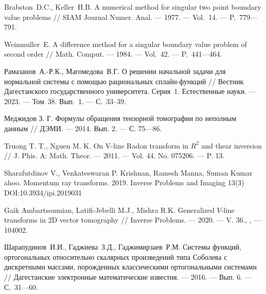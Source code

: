 \begin{thebibliography}{11}
Brabston~D.C., Keller~H.B. A numerical method for singular
 two point  boundary value problems
 // SIAM Journal Numer. Anal. --- 1977. --- Vol.~14. --- P.~779---791.





Weinmuller~E. A difference  method for a singular
 boundary value problem of second order
 // Math. Comput. --- 1984. --- Vol.~42. --- P.~441---464. 
 




Рамазанов~А.-Р.К., Магомедова~В.Г. О решении начальной задачи для 
нормальной системы с помощью рациональных сплайн-функций // Вестник Дагестанского 
государственного университета. Серия~1. Естественные науки. --- 2023. --- Том~38. Вып.~1. 
--- С.~33--39. 






Меджидов З. Г. Формулы обращения тензорной томографии по неполным данным // ДЭМИ. --- 2014. Вып. 2. --- С. 75---86.





Truong T. T., Nguen M. K. On V-line Radon transform in $R^2$   and thear inversion // J. Phis. A: Math. Theor. --- 2011. --- Vol. 44. No. 075206. --- P. 13.





Sharafutdinov V., Venkateswaran P. Krishnan, Ramesh Manna, Suman Kumar ahoo. Momentum ray transforms. 2019. Inverse Problems and Imaging 13(3) DOI:10.3934/ipi.2019031





Gaik Ambartsoumian, Latifi-Jebelli M.J., Mishra R.K.
Generalized $V$-line transforms in 2D vector tomography
//
Inverse Problems.
--- 2020.
--- V. 36., ,
--- 104002.
  




{Шарапудинов~И.И., Гаджиева~З.Д., Гаджимирзаев~Р.М.} 
Системы функций, ортогональных относительно скалярных произведений типа Соболева с дискретными массами, порожденных классическими ортогональными системами 
// 
Дагестанские электронные математические известия. 
--- 2016. 
--- Вып. 6.
--- С.~31---60.






\end{thebibliography}
